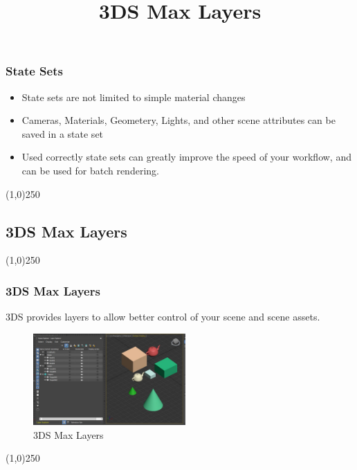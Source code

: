 \begin{frame}
\frametitle{State Sets}
\begin{itemize}
\item State sets are not limited to simple material changes
\item Cameras, Materials, Geometery, Lights, and other scene attributes can be saved in a state set
\item Used correctly state sets can greatly improve the speed of your workflow, and can be used for batch rendering.
\end{itemize}
\end{frame}
\begin{center}\line(1,0){250}\end{center}



\subsection{3DS Max Layers}
\begin{frame}
\title[3DS Max Layers]{3DS Max Layers}
\titlepage
\end{frame}\begin{center}\line(1,0){250}\end{center}



\begin{frame}
\frametitle{3DS Max Layers}
3DS provides layers to allow better control of your scene and scene assets.
\begin{figure}
\centering
\includegraphics[height=3.5cm]{3DSUI/Layers1}
\caption[3DS Max Layers]{3DS Max Layers}
\label{fig:LayersDialog}
\end{figure}
\end{frame}
\begin{center}\line(1,0){250}\end{center}


